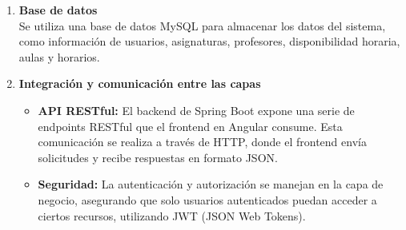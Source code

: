 \documentclass{article} %
\begin{document}
\begin{enumerate}[font=\bfseries]
        \item \textbf{Base de datos} \\
        \noindent Se utiliza una base de datos MySQL para almacenar los datos del sistema, como información de usuarios, asignaturas, profesores, disponibilidad horaria, aulas y horarios.
        
        \item \textbf{Integración y comunicación entre las capas}
        \begin{itemize}
            \item \textbf{API RESTful:} El backend de Spring Boot expone una serie de endpoints RESTful que el frontend en Angular consume. Esta comunicación se realiza a través de HTTP, donde el frontend envía solicitudes y recibe respuestas en formato JSON.
            \item \textbf{Seguridad:} La autenticación y autorización se manejan en la capa de negocio, asegurando que solo usuarios autenticados puedan acceder a ciertos recursos, utilizando JWT (JSON Web Tokens).
        \end{itemize}
    \end{enumerate}
    
\end{document}

